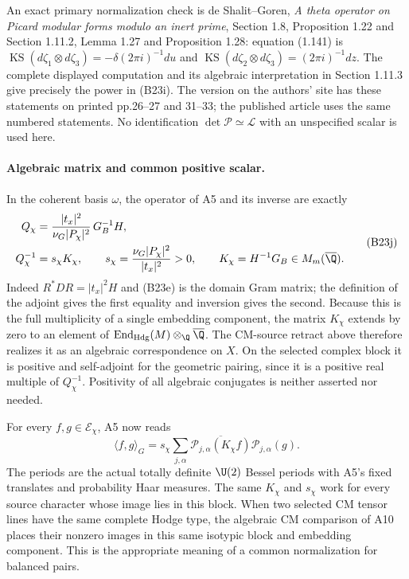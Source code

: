 An exact primary normalization check is de Shalit--Goren,
\emph{A theta operator on Picard modular forms modulo
an inert prime}, Section 1.8, Proposition 1.22 and
Section 1.11.2, Lemma 1.27 and Proposition 1.28:
equation (1.141) is
$\operatorname{KS}(d\zeta_1\otimes d\zeta_3)
=-\delta(2\pi i)^{-1}du$ and
$\operatorname{KS}(d\zeta_2\otimes d\zeta_3)
=(2\pi i)^{-1}dz$.
The complete displayed computation and its algebraic
interpretation in Section 1.11.3 give precisely the
power in (B23i).  The version on the authors' site has
these statements on printed pp.26--27 and 31--33;
the published article uses the same numbered statements.
No identification $\det\mathcal P\simeq\mathcal L$
with an unspecified scalar is used here.

\paragraph{Algebraic matrix and common positive scalar.}
In the coherent basis $\omega$, the operator of A5 and
its inverse are exactly
\[
 \begin{split}
 Q_\chi&=
     \frac{|t_x|^2}{\nu_G|P_\chi|^2}\,G_B^{-1}H,\\
 Q_\chi^{-1}&=s_\chi K_\chi,
 \qquad
 s_\chi=\frac{\nu_G|P_\chi|^2}{|t_x|^2}>0,
 \qquad K_\chi=H^{-1}G_B\in M_m(\overline\Q).
 \end{split}
 \tag{B23j}
\]
Indeed $R^*DR=|t_x|^2H$ and (B23e) is the domain
Gram matrix; the definition of the adjoint gives the
first equality and inversion gives the second.
Because this is the full multiplicity of a single
embedding component, the matrix $K_\chi$ extends by
zero to an element of
$\operatorname{End}_{\rm Hdg}(M)\otimes_\Q\overline\Q$.
The CM-source retract above therefore realizes it as
an algebraic correspondence on $X$.  On the selected
complex block it is positive and self-adjoint for
the geometric pairing, since it is a positive real
multiple of $Q_\chi^{-1}$.  Positivity of all algebraic
conjugates is neither asserted nor needed.

For every $f,g\in\mathcal E_\chi$, A5 now reads
\[
 \langle f,g\rangle_G
   =s_\chi\sum_{j,\alpha}
       \overline{\mathcal P_{j,\alpha}(K_\chi f)}
                       \mathcal P_{j,\alpha}(g).
 \tag{B23k}
\]
The periods are the actual totally definite $\U(2)$
Bessel periods with A5's fixed translates and probability
Haar measures.  The same $K_\chi$ and $s_\chi$ work for
every source character whose image lies in this block.
When two selected CM tensor lines have the same complete
Hodge type, the algebraic CM comparison of A10 places
their nonzero images in this same isotypic block and
embedding component.  This is the appropriate meaning
of a common normalization for balanced pairs.

